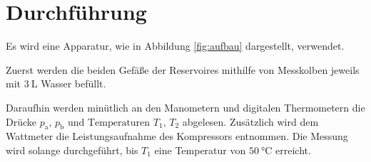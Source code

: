 \section{Durchführung}
\label{sec:Durchführung}

Es wird eine Apparatur, wie in Abbildung \ref{fig:aufbau} dargestellt, verwendet.

Zuerst werden die beiden Gefäße der Reservoires mithilfe von Messkolben 
jeweils mit $\SI{3}{\liter}$ Wasser befüllt. 

Daraufhin werden minütlich an den Manometern und digitalen
Thermometern die Drücke $p_\text{a} \text{, } p_\text{b} \text{ und Temperaturen }
T_1 \text{, } T_2$ abgelesen. Zusätzlich wird dem Wattmeter die Leistungsaufnahme 
des Kompressors entnommen. Die Messung wird solange durchgeführt, bis $T_1$ eine
Temperatur von $\SI{50}{\celsius}$ erreicht.
